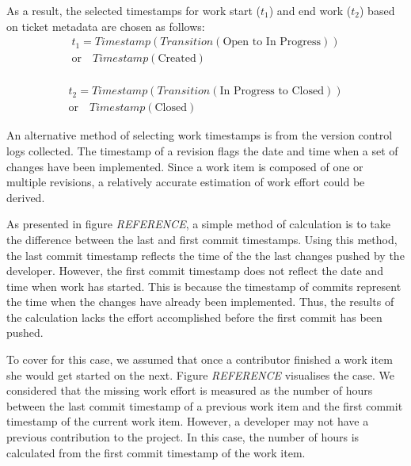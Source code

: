 \documentclass{mpaper}
\begin{document}
As a result, the selected timestamps for work start ($t_{1}$) and end work
($t_{2}$) based on ticket metadata are chosen as follows:
\begin{equation}
  \label{eq-ticket-start}
  \begin{aligned}
    t_{1} = Timestamp(Transition(\textrm{Open to In Progress})) \\ 
      \textrm{or} \quad Timestamp(\textrm{Created}) \\
  \end{aligned}
\end{equation}

\begin{equation}
  \label{eq-ticket-closed}
  \begin{aligned}
    t_{2} = Timestamp(Transition(\textrm{In Progress to Closed})) \\ 
      \textrm{or} \quad Timestamp(\textrm{Closed})    
  \end{aligned}
\end{equation}

An alternative method of selecting work timestamps is from the version control
logs collected. The timestamp of a revision flags the date and time when a set
of changes have been implemented. Since a work item is composed of one or
multiple revisions, a relatively accurate estimation of work effort could be
derived.

As presented in figure \emph{REFERENCE}, a simple method of calculation is to
take the difference between the last and first commit timestamps. Using this
method, the last commit timestamp reflects the time of the the last changes
pushed by the developer. However, the first commit timestamp does not reflect
the date and time when work has started. This is because the timestamp of
commits represent the time when the changes have already been implemented. Thus,
the results of the calculation lacks the effort accomplished before the first
commit has been pushed.

To cover for this case, we assumed that once a contributor finished a work item
she would get started on the next. Figure \emph{REFERENCE} visualises the case.
We considered that the missing work effort is measured as the number of hours
between the last commit timestamp of a previous work item and the first commit
timestamp of the current work item. However, a developer may not have a previous
contribution to the project. In this case, the number of hours is calculated
from the first commit timestamp of the work item.
\end{document}
